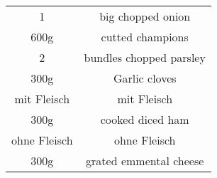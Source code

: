 \begin{tabular}{c | c}
  1 & big chopped onion\\
  600g & cutted champions \\
  2 & bundles chopped parsley \\
  300g & Garlic cloves \\
  mit Fleisch & mit Fleisch\\
  300g & cooked diced ham \\
  ohne Fleisch & ohne Fleisch \\
  300g & grated emmental cheese \\
\end{tabular}